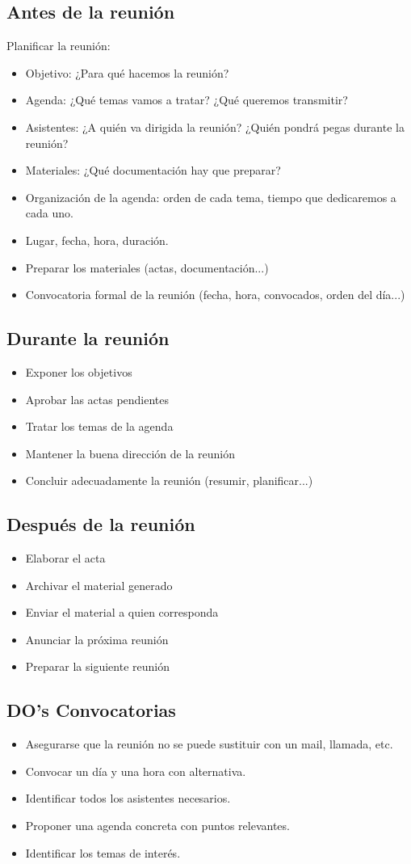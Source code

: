 \documentclass{article}
\begin{document}
\subsection{Antes de la reunión}
Planificar la reunión:
\begin{itemize}
	\item Objetivo: ¿Para qué hacemos la reunión?
	\item Agenda: ¿Qué temas vamos a tratar? ¿Qué queremos transmitir?
	\item Asistentes: ¿A quién va dirigida la reunión? ¿Quién pondrá pegas durante la reunión?
	\item Materiales: ¿Qué documentación hay que preparar?
	\item Organización de la agenda: orden de cada tema, tiempo que dedicaremos a cada uno.
	\item Lugar, fecha, hora, duración.
	\item Preparar los materiales (actas, documentación...)
	\item Convocatoria formal de la reunión (fecha, hora, convocados, orden del día...)
\end{itemize}
\subsection{Durante la reunión}
\begin{itemize}
	\item Exponer los objetivos
	\item Aprobar las actas pendientes
	\item Tratar los temas de la agenda
	\item Mantener la buena dirección de la reunión
	\item Concluir adecuadamente la reunión (resumir, planificar...)
\end{itemize}
\subsection{Después de la reunión}
\begin{itemize}
	\item Elaborar el acta
	\item Archivar el material generado
	\item Enviar el material a quien corresponda
	\item Anunciar la próxima reunión
	\item Preparar la siguiente reunión
\end{itemize}
\subsection{DO's Convocatorias}
\begin{itemize}
	\item Asegurarse que la reunión no se puede sustituir con un mail, llamada, etc.
	\item Convocar un día y una hora con alternativa.
	\item Identificar todos los asistentes necesarios.
	\item Proponer una agenda concreta con puntos relevantes.
	\item Identificar los temas de interés.
\end{itemize}
\end{document}
